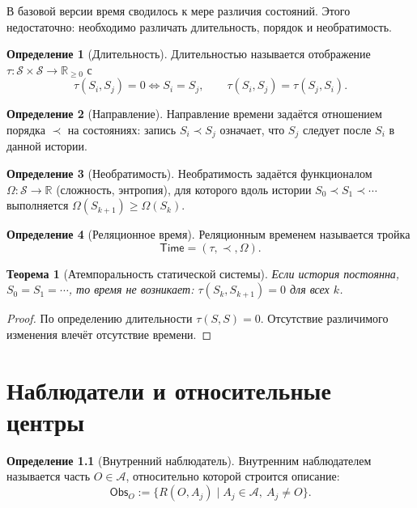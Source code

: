 \documentclass[12pt,a4paper,oneside]{book}
\theoremstyle{definition}
\newtheorem{definition}{Определение}[chapter]
\theoremstyle{plain}
\newtheorem{theorem}{Теорема}[chapter]
\theoremstyle{remark}
\newcommand{\Parts}{\mathcal A}
\newcommand{\Rel}{R}
\newcommand{\State}{S}
\newcommand{\States}{\mathcal S}
\newcommand{\Time}{\mathsf{Time}}
\newcommand{\Observer}{\mathsf{Obs}}
\begin{document}
В базовой версии время сводилось к мере различия состояний. Этого недостаточно:
необходимо различать длительность, порядок и необратимость.

\begin{definition}[Длительность]
Длительностью называется отображение $\tau:\States\times\States\to\mathbb R_{\ge0}$
с
\[
\tau(\State_i,\State_j)=0\iff\State_i=\State_j,\qquad
\tau(\State_i,\State_j)=\tau(\State_j,\State_i).
\]
\end{definition}

\begin{definition}[Направление]
Направление времени задаётся отношением порядка $\prec$ на состояниях: запись
$\State_i\prec\State_j$ означает, что $\State_j$ следует после $\State_i$ в данной
истории.
\end{definition}

\begin{definition}[Необратимость]
Необратимость задаётся функционалом $\Omega:\States\to\mathbb R$ (сложность,
энтропия), для которого вдоль истории $\State_0\prec\State_1\prec\cdots$ выполняется
$\Omega(\State_{k+1})\ge\Omega(\State_k)$.
\end{definition}

\begin{definition}[Реляционное время]
Реляционным временем называется тройка
\[
\Time=(\tau,\prec,\Omega).
\]
\end{definition}

\begin{theorem}[Атемпоральность статической системы]
Если история постоянна, $\State_0=\State_1=\cdots$, то время не возникает:
$\tau(\State_k,\State_{k+1})=0$ для всех $k$.
\end{theorem}

\begin{proof}
По определению длительности $\tau(\State,\State)=0$. Отсутствие различимого изменения
влечёт отсутствие времени.
\end{proof}

\chapter{Наблюдатели и относительные центры}

\begin{definition}[Внутренний наблюдатель]
Внутренним наблюдателем называется часть $O\in\Parts$, относительно которой строится
описание:
\[
\Observer_O:=\{\Rel(O,A_j)\mid A_j\in\Parts,\ A_j\neq O\}.
\]
\end{definition}
\end{document}
